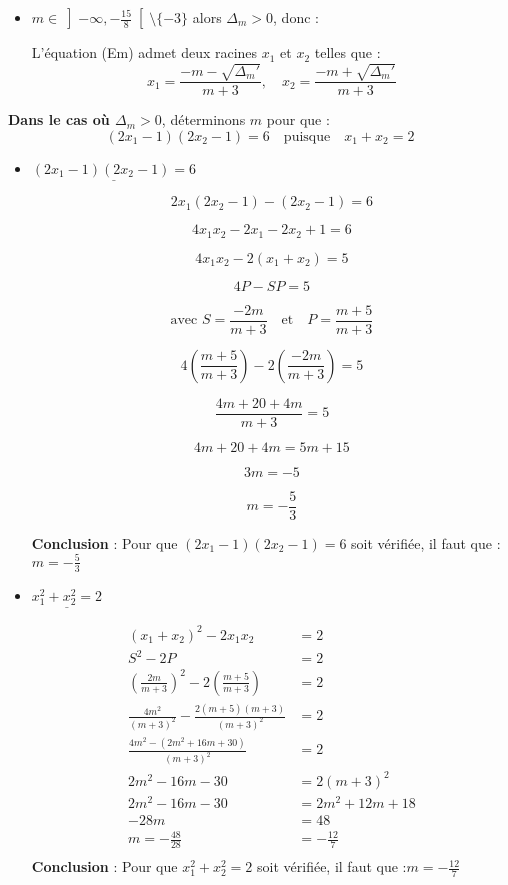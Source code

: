 \documentclass[12pt,a4paper]{article}
\begin{document}
\begin{enumerate}
\begin{itemize}
		\item \( m \in \left]-\infty, -\frac{15}{8} \right[ \setminus \{-3\} \) alors \( \Delta_m > 0 \), donc :

L'équation (Em) admet deux racines \(x_1\) et \(x_2\) telles que :
\[
x_1 = \frac{-m - \sqrt{\Delta_m'}}{m+3}, \quad x_2 = \frac{-m + \sqrt{\Delta_m'}}{m+3}
\]
\end{itemize}

\textbf{Dans le cas où \( \Delta_m > 0 \)}, déterminons \( m \) pour que :
\[
(2x_1 - 1)(2x_2 - 1) = 6 \quad \text{puisque} \quad x_1 + x_2 = 2
\]
\begin{itemize}

\item $ \underline{(2x_1 - 1)(2x_2 - 1) = 6} $

\[
2x_1 (2x_2 - 1) - (2x_2 - 1) = 6
\]

\[
4x_1 x_2 - 2x_1 - 2x_2 + 1 = 6
\]

\[
4x_1 x_2 - 2(x_1 + x_2) = 5
\]

\[
4P - SP = 5
\]

\[ \text{avec }
S = \frac{-2m}{m+3} \quad \text{et} \quad P = \frac{m+5}{m+3}
\]

\[
4 \left( \frac{m+5}{m+3} \right) - 2 \left( \frac{-2m}{m+3} \right) = 5
\]

\[
\frac{4m + 20 + 4m}{m+3} = 5
\]

\[
4m + 20 + 4m = 5m + 15
\]

\[
3m = -5
\]

\[
m = -\frac{5}{3}
\]

\textbf{Conclusion} :  
Pour que \( (2x_1 - 1)(2x_2 - 1) = 6 \) soit vérifiée, il faut que :
\(
m = -\frac{5}{3}
\)
\newpage
\item $ \underline{x_1^{2} + x_2^{2} = 2} $

\begin{align*}
\left( x_1 + x_2 \right)^2 - 2x_1x_2 &= 2\\
S^2 - 2P &= 2\\
\left( \frac{2m}{m+3} \right)^2 - 2 \left( \frac{m+5}{m+3} \right) &= 2\\
\frac{4m^2}{(m+3)^2} - \frac{2(m+5)(m+3)}{(m+3)^2} &= 2\\
\frac{4m^2 - \left( 2m^2 + 16m + 30 \right)}{(m+3)^2} &= 2\\
2m^2 - 16m - 30 &= 2(m+3)^2\\
2m^2 - 16m - 30 &= 2m^2 + 12m + 18\\
-28m &= 48\\
m = -\frac{48}{28} &= -\frac{12}{7}\\
\end{align*}
\textbf{Conclusion} :  
Pour que \( x_1^{2} + x_2^{2} = 2 \) soit vérifiée, il faut que :\( m = -\frac{12}{7} \)
\end{itemize}


\end{enumerate}
\end{document}
